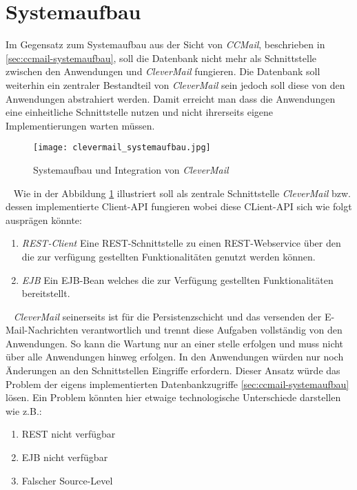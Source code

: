 \section{Systemaufbau}
Im Gegensatz zum Systemaufbau aus der Sicht von \emph{CCMail}, beschrieben in \ref{sec:ccmail-systemaufbau}, soll die Datenbank nicht mehr als Schnittstelle zwischen den Anwendungen und \emph{CleverMail} fungieren. Die Datenbank soll weiterhin ein zentraler Bestandteil von \emph{CleverMail} sein jedoch soll diese von den Anwendungen abstrahiert werden. Damit erreicht man dass die Anwendungen eine einheitliche Schnittstelle nutzen und nicht ihrerseits eigene Implementierungen warten müssen.
\begin{figure}[h]
\centering
\texttt{[image: clevermail\_systemaufbau.jpg]} %
\caption{Systemaufbau und Integration von \emph{CleverMail}}
\label{fig:clevermail-system-und-integration}
\end{figure}
\ \newline
Wie in der Abbildung \ref{fig:clevermail-system-und-integration} illustriert soll als zentrale Schnittstelle \emph{CleverMail} bzw. dessen implementierte Client-API fungieren wobei diese CLient-API sich wie folgt ausprägen könnte:
\begin{enumerate}
	\item\emph{REST-Client}
	\newline
	Eine REST-Schnittstelle zu einen REST-Webservice über den die zur verfügung gestellten Funktionalitäten genutzt werden können.
	\item\emph{EJB}
	\newline
	Ein EJB-Bean welches die zur Verfügung gestellten Funktionalitäten bereitstellt.
\end{enumerate}
\ \newline
\emph{CleverMail} seinerseits ist für die Persistenzschicht und das versenden der E-Mail-Nachrichten verantwortlich und trennt diese Aufgaben vollständig von den Anwendungen. So kann die Wartung nur an einer stelle erfolgen und muss nicht über alle Anwendungen hinweg erfolgen. In den Anwendungen würden nur noch Änderungen an den Schnittstellen Eingriffe erfordern.
\newpage
Dieser Ansatz würde das Problem der eigens implementierten Datenbankzugriffe \ref{sec:ccmail-systemaufbau} lösen. Ein Problem könnten hier etwaige technologische Unterschiede darstellen wie z.B.:
\begin{enumerate}
	\item REST nicht verfügbar
	\item EJB nicht verfügbar
	\item Falscher Source-Level
\end{enumerate}
